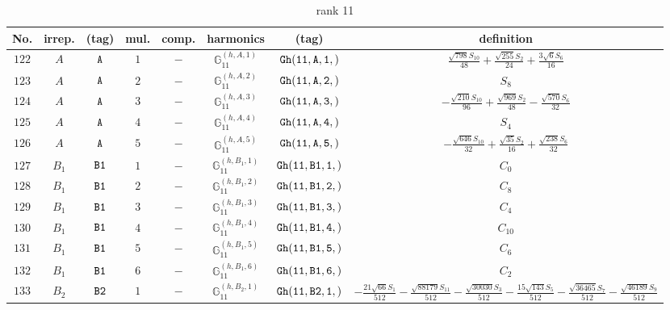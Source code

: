 \documentclass[fleqn,8pt]{jsarticle}
\begin{document}
\begin{table}[ht!]
\begin{center}
\caption{rank 11}
\renewcommand{\arraystretch}{1.3}
\begin{tabular}{cccccccc} \hline \hline
No. & irrep. & (tag) & mul. & comp. & harmonics & (tag) & definition \\ \hline
$ 122 $ & $ A $ & $ {\tt A} $ & $ 1 $ & $ - $ & $ \mathbb{G}_{11}^{(h,A,1)} $ & $ {\tt Gh(11,A,1,)} $ & $ \frac{\sqrt{798} S_{10}}{48} + \frac{\sqrt{255} S_{2}}{24} + \frac{3 \sqrt{6} S_{6}}{16} $ \\
$ 123 $ & $ A $ & $ {\tt A} $ & $ 2 $ & $ - $ & $ \mathbb{G}_{11}^{(h,A,2)} $ & $ {\tt Gh(11,A,2,)} $ & $ S_{8} $ \\
$ 124 $ & $ A $ & $ {\tt A} $ & $ 3 $ & $ - $ & $ \mathbb{G}_{11}^{(h,A,3)} $ & $ {\tt Gh(11,A,3,)} $ & $ - \frac{\sqrt{210} S_{10}}{96} + \frac{\sqrt{969} S_{2}}{48} - \frac{\sqrt{570} S_{6}}{32} $ \\
$ 125 $ & $ A $ & $ {\tt A} $ & $ 4 $ & $ - $ & $ \mathbb{G}_{11}^{(h,A,4)} $ & $ {\tt Gh(11,A,4,)} $ & $ S_{4} $ \\
$ 126 $ & $ A $ & $ {\tt A} $ & $ 5 $ & $ - $ & $ \mathbb{G}_{11}^{(h,A,5)} $ & $ {\tt Gh(11,A,5,)} $ & $ - \frac{\sqrt{646} S_{10}}{32} + \frac{\sqrt{35} S_{2}}{16} + \frac{\sqrt{238} S_{6}}{32} $ \\
$ 127 $ & $ B_{1} $ & $ {\tt B1} $ & $ 1 $ & $ - $ & $ \mathbb{G}_{11}^{(h,B_{1},1)} $ & $ {\tt Gh(11,B1,1,)} $ & $ C_{0} $ \\
$ 128 $ & $ B_{1} $ & $ {\tt B1} $ & $ 2 $ & $ - $ & $ \mathbb{G}_{11}^{(h,B_{1},2)} $ & $ {\tt Gh(11,B1,2,)} $ & $ C_{8} $ \\
$ 129 $ & $ B_{1} $ & $ {\tt B1} $ & $ 3 $ & $ - $ & $ \mathbb{G}_{11}^{(h,B_{1},3)} $ & $ {\tt Gh(11,B1,3,)} $ & $ C_{4} $ \\
$ 130 $ & $ B_{1} $ & $ {\tt B1} $ & $ 4 $ & $ - $ & $ \mathbb{G}_{11}^{(h,B_{1},4)} $ & $ {\tt Gh(11,B1,4,)} $ & $ C_{10} $ \\
$ 131 $ & $ B_{1} $ & $ {\tt B1} $ & $ 5 $ & $ - $ & $ \mathbb{G}_{11}^{(h,B_{1},5)} $ & $ {\tt Gh(11,B1,5,)} $ & $ C_{6} $ \\
$ 132 $ & $ B_{1} $ & $ {\tt B1} $ & $ 6 $ & $ - $ & $ \mathbb{G}_{11}^{(h,B_{1},6)} $ & $ {\tt Gh(11,B1,6,)} $ & $ C_{2} $ \\
$ 133 $ & $ B_{2} $ & $ {\tt B2} $ & $ 1 $ & $ - $ & $ \mathbb{G}_{11}^{(h,B_{2},1)} $ & $ {\tt Gh(11,B2,1,)} $ & $ - \frac{21 \sqrt{66} S_{1}}{512} - \frac{\sqrt{88179} S_{11}}{512} - \frac{\sqrt{30030} S_{3}}{512} - \frac{15 \sqrt{143} S_{5}}{512} - \frac{\sqrt{36465} S_{7}}{512} - \frac{\sqrt{46189} S_{9}}{512} $ \\

\end{tabular}
\end{center}
\end{table}
\end{document}
